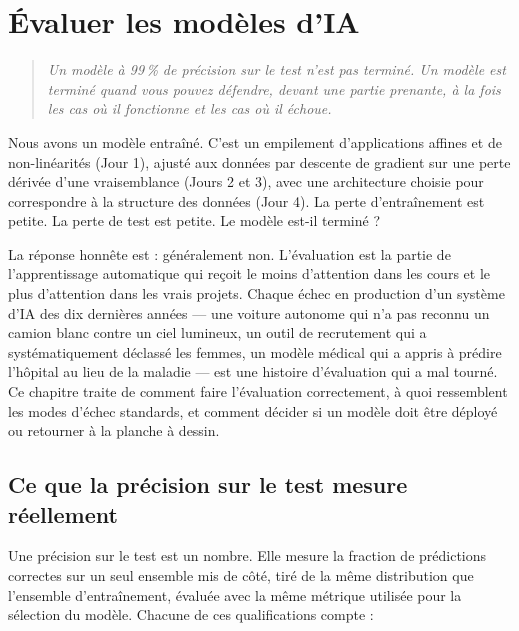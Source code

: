\chapter{Évaluer les modèles d'IA}
\label{ch:jour5}

\begin{quote}
\emph{\og Un modèle à 99\,\% de précision sur le test n'est pas terminé. Un modèle est terminé quand vous pouvez défendre, devant une partie prenante, à la fois les cas où il fonctionne et les cas où il échoue. \fg}
\end{quote}

Nous avons un modèle entraîné. C'est un empilement d'applications affines et de non-linéarités (Jour 1), ajusté aux données par descente de gradient sur une perte dérivée d'une vraisemblance (Jours 2 et 3), avec une architecture choisie pour correspondre à la structure des données (Jour 4). La perte d'entraînement est petite. La perte de test est petite. Le modèle est-il terminé ?

La réponse honnête est : généralement non. L'évaluation est la partie de l'apprentissage automatique qui reçoit le moins d'attention dans les cours et le plus d'attention dans les vrais projets. Chaque échec en production d'un système d'IA des dix dernières années --- une voiture autonome qui n'a pas reconnu un camion blanc contre un ciel lumineux, un outil de recrutement qui a systématiquement déclassé les femmes, un modèle médical qui a appris à prédire l'hôpital au lieu de la maladie --- est une histoire d'évaluation qui a mal tourné. Ce chapitre traite de comment faire l'évaluation correctement, à quoi ressemblent les modes d'échec standards, et comment décider si un modèle doit être déployé ou retourner à la planche à dessin.

\section{Ce que la précision sur le test mesure réellement}

Une précision sur le test est un nombre. Elle mesure la fraction de prédictions correctes sur un seul ensemble mis de côté, tiré de la même distribution que l'ensemble d'entraînement, évaluée avec la même métrique utilisée pour la sélection du modèle. Chacune de ces qualifications compte :

